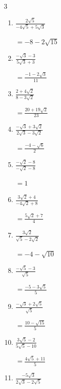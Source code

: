 \begin{multicols}{3}
\begin{enumerate}
  \itemsep=80pt
  \item $\displaystyle \frac{2\sqrt{5}}{-4\sqrt{5}+5\sqrt{3}}$

        $\displaystyle =-8-2\sqrt{15}$

  \item $\displaystyle \frac{-\sqrt{3}-3}{5\sqrt{3}+3}$

        $\displaystyle =\frac{-1-2\sqrt{3}}{11}$

  \item $\displaystyle \frac{2+4\sqrt{2}}{8-3\sqrt{2}}$

        $\displaystyle =\frac{20+19\sqrt{2}}{23}$

  \item $\displaystyle \frac{-\sqrt{3}+3\sqrt{2}}{2\sqrt{3}-3\sqrt{2}}$

        $\displaystyle =\frac{-4-\sqrt{6}}{2}$

  \item $\displaystyle \frac{-\sqrt{2}-8}{-\sqrt{2}-8}$

        $\displaystyle =1$

\columnbreak %

  \item $\displaystyle \frac{3\sqrt{2}+4}{-4\sqrt{2}+8}$

        $\displaystyle =\frac{5\sqrt{2}+7}{4}$

  \item $\displaystyle \frac{3\sqrt{2}}{\sqrt{5}-2\sqrt{2}}$

        $\displaystyle =-4-\sqrt{10}$

  \item $\displaystyle \frac{-\sqrt{5}-3}{\sqrt{5}}$

        $\displaystyle =\frac{-5-3\sqrt{5}}{5}$

  \item $\displaystyle \frac{-\sqrt{3}+2\sqrt{5}}{\sqrt{5}}$

        $\displaystyle =\frac{10-\sqrt{15}}{5}$

  \item $\displaystyle \frac{3\sqrt{5}-2}{5\sqrt{5}-10}$

        $\displaystyle =\frac{4\sqrt{5}+11}{5}$

\columnbreak %

  \item $\displaystyle \frac{-5\sqrt{3}}{2\sqrt{3}-2\sqrt{5}}$


\end{enumerate}
\end{multicols}
